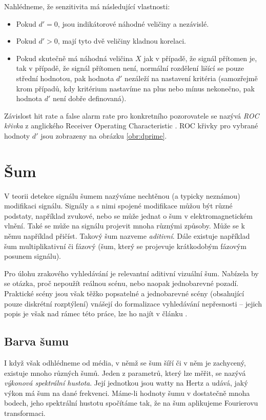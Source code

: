 Nahlédneme, že senzitivita má následující vlastnosti:
\begin{itemize}
\item Pokud $d' = 0$, jsou indikátorové náhodné veličiny  a  nezávislé.
\item Pokud $d' > 0$, mají tyto dvě veličiny kladnou korelaci.
\item Pokud skutečně má náhodná veličina $X$ jak v případě, že signál přítomen je, tak v případě, že signál přítomen není, normální rozdělení lišící se pouze střední hodnotou, pak hodnota $d'$ nezáleží na nastavení kritéria (samozřejmě krom případů, kdy kritérium nastavíme na plus nebo mínus nekonečno, pak hodnota $d'$ není dobře definovaná).
\end{itemize}

Závislost hit rate a false alarm rate pro konkretního pozorovatele se nazývá {\it ROC křivka} z anglického Receiver Operating Characteristic \citep{SwetsSDT,GreenSDT}. ROC křivky pro vybrané hodnoty $d'$ jsou zobrazeny na obrázku \ref{obr:dprime}.  

\section{Šum}

V teorii detekce signálu šumem nazýváme nechtěnou (a typicky neznámou)
modifikaci signálu.  Signály a s nimi spojené modifikace můžou být různé
podstaty, například zvukové, nebo se může jednat o šum v elektromagnetickém
vlnění. Také se může na signálu projevit mnoha různými způsoby. Může se k němu
například přičíst. Takový šum nazveme {\it aditivní}. Dále existuje například
 šum multiplikativní či fázový (šum, který se projevuje krátkodobým
fázovým posunem signálu).

Pro úlohu zrakového vyhledávání je relevantní aditivní vizuální šum. Nabízela
by se otázka, proč nepoužít reálnou scénu, nebo naopak jednobarevné pozadí.
Praktické scény jsou však těžko popsatelné a jednobarevné scény (obsahující
pouze diskrétní rozptýlení) vnášejí do formalizace vyhledávání nepřesnosti --
jejich popis je však nad rámec této práce, lze ho najít v článku
\citep{WhyNoise}.

  

\subsection{Barva šumu}

I když však
odhlédneme od média, v němž se šum šíří či v něm je zachycený, existuje mnoho
různých šumů. Jeden z parametrů, který lze měřit, se nazývá {\it výkonová
spektrální hustota}. Její jednotkou jsou watty na Hertz a udává, jaký výkon má šum na dané frekvenci. Máme-li hodnoty šumu v dostatečně mnoha bodech, jeho spektrální hustotu spočítáme tak, že na šum aplikujeme
Fourierovu transformaci.


